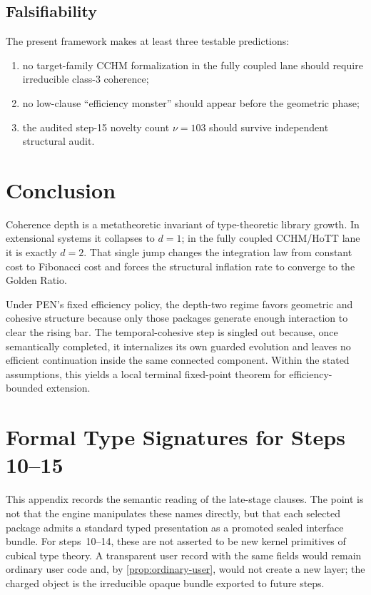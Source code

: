 \documentclass[11pt,a4paper]{article}
\theoremstyle{plain}
\theoremstyle{definition}
\theoremstyle{remark}
\begin{document}
\subsection{Falsifiability}

The present framework makes at least three testable predictions:
\begin{enumerate}[nosep]
    \item no target-family CCHM formalization in the fully coupled lane should require irreducible class-$3$ coherence;
    \item no low-clause ``efficiency monster'' should appear before the geometric phase;
    \item the audited step-15 novelty count $\nu=103$ should survive independent structural audit.
\end{enumerate}

\section{Conclusion}
\label{sec:conclusion}

Coherence depth is a metatheoretic invariant of type-theoretic library growth.  In extensional systems it collapses to $d=1$; in the fully coupled CCHM/HoTT lane it is exactly $d=2$.  That single jump changes the integration law from constant cost to Fibonacci cost and forces the structural inflation rate to converge to the Golden Ratio.

Under PEN's fixed efficiency policy, the depth-two regime favors geometric and cohesive structure because only those packages generate enough interaction to clear the rising bar.  The temporal-cohesive step is singled out because, once semantically completed, it internalizes its own guarded evolution and leaves no efficient continuation inside the same connected component.  Within the stated assumptions, this yields a local terminal fixed-point theorem for efficiency-bounded extension.

\appendix

\section{Formal Type Signatures for Steps 10--15}
\label{app:signatures}

This appendix records the semantic reading of the late-stage clauses.  The point is not that the engine manipulates these names directly, but that each selected package admits a standard typed presentation as a promoted sealed interface bundle.  For steps~10--14, these are not asserted to be new kernel primitives of cubical type theory.  A transparent user record with the same fields would remain ordinary user code and, by \cref{prop:ordinary-user}, would not create a new layer; the charged object is the irreducible opaque bundle exported to future steps.
\end{document}
